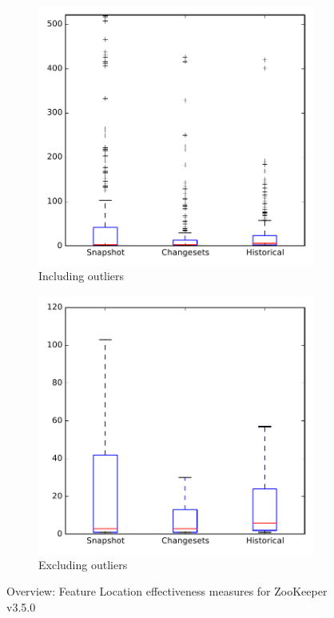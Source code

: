 
\begin{figure}
    \centering
    \begin{subfigure}{.4\textwidth}
        \centering
        \includegraphics[height=0.4\textheight]{figures/flt/all_zookeeper}
        \caption{Including outliers}\label{fig:flt:all:zookeeper_outlier}
    \end{subfigure}%
    \begin{subfigure}{.4\textwidth}
        \centering
        \includegraphics[height=0.4\textheight]{figures/flt/all_zookeeper_no_outlier}
        \caption{Excluding outliers}\label{fig:flt:all:zookeeper_no_outlier}
    \end{subfigure}
\caption{Overview: Feature Location effectiveness measures for ZooKeeper v3.5.0}
\label{fig:flt:all:zookeeper}
\end{figure}
